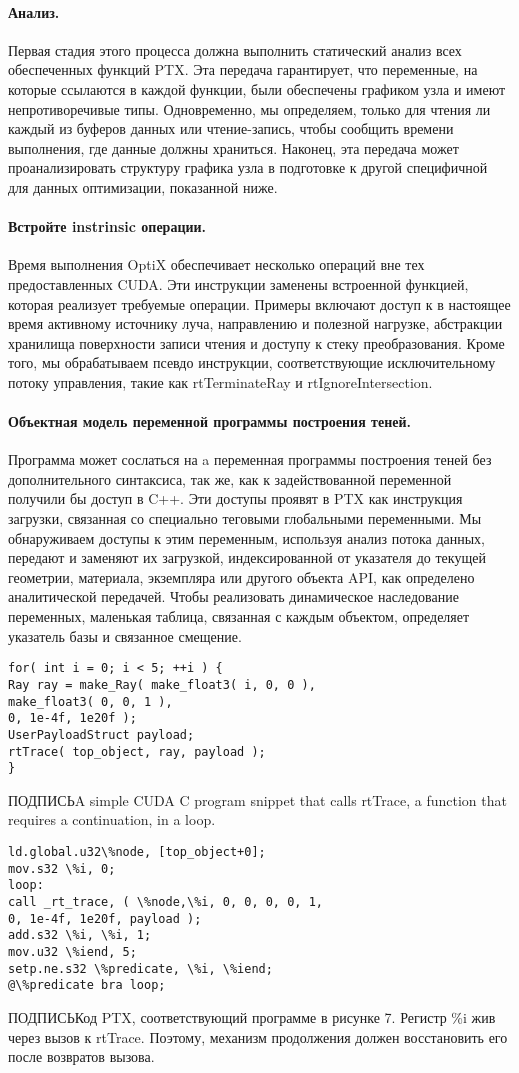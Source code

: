 \paragraph{ Анализ.} 
Первая стадия этого процесса должна выполнить статический анализ всех обеспеченных функций PTX. Эта передача гарантирует, что переменные, на которые ссылаются в каждой функции, были обеспечены
графиком узла и имеют непротиворечивые типы. Одновременно, мы определяем, только для чтения ли каждый из буферов данных или чтение-запись, чтобы сообщить времени выполнения, где данные должны храниться. Наконец, эта передача может проанализировать структуру графика узла в подготовке к другой специфичной для данных оптимизации, показанной ниже.
\paragraph{ Встройте instrinsic операции.} 
Время выполнения OptiX обеспечивает несколько операций вне тех предоставленных CUDA. Эти инструкции заменены встроенной функцией, которая реализует требуемые операции. Примеры включают доступ к в настоящее время активному источнику луча, направлению и полезной нагрузке, абстракции хранилища поверхности записи чтения и доступу к стеку преобразования. Кроме того, мы обрабатываем псевдо инструкции, соответствующие исключительному потоку управления, такие как rtTerminateRay и rtIgnoreIntersection. 
\paragraph{Объектная модель переменной программы построения теней.}
 Программа может сослаться на a переменная программы построения теней без дополнительного синтаксиса, так же, как к задействованной переменной получили бы доступ в C++. Эти доступы проявят в PTX как инструкция загрузки, связанная со специально теговыми глобальными переменными.
Мы обнаруживаем доступы к этим переменным, используя анализ потока данных, передают и заменяют их загрузкой, индексированной от указателя до текущей геометрии, материала, экземпляра или другого объекта API, как определено аналитической передачей. Чтобы реализовать динамическое наследование переменных, маленькая таблица, связанная с каждым объектом, определяет указатель базы и связанное смещение.

\begin{verbatim}
for( int i = 0; i < 5; ++i ) {
Ray ray = make_Ray( make_float3( i, 0, 0 ),
make_float3( 0, 0, 1 ),
0, 1e-4f, 1e20f );
UserPayloadStruct payload;
rtTrace( top_object, ray, payload );
}
\end{verbatim}
ПОДПИСЬA simple CUDA C program snippet that calls rtTrace, a function that requires a continuation, in a loop.
\begin{verbatim}
ld.global.u32\%node, [top_object+0];
mov.s32 \%i, 0;
loop:
call _rt_trace, ( \%node,\%i, 0, 0, 0, 0, 1,
0, 1e-4f, 1e20f, payload );
add.s32 \%i, \%i, 1;
mov.u32 \%iend, 5;
setp.ne.s32 \%predicate, \%i, \%iend;
@\%predicate bra loop;
\end{verbatim}
ПОДПИСЬКод PTX, соответствующий программе в рисунке 7. Регистр \%i жив через вызов к rtTrace. Поэтому, механизм продолжения должен восстановить его после возвратов вызова.

